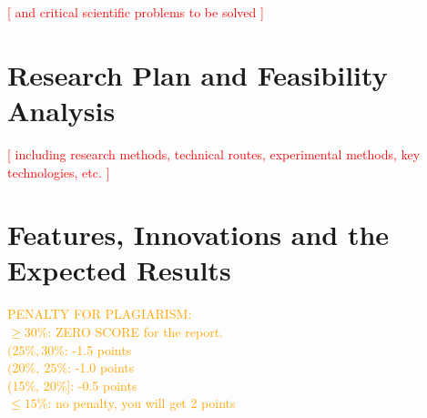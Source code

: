 \documentclass[a4paper]{article}
\newcommand{\todo}[1]{\textcolor{red}{[ #1 ]}}
\newcommand{\instruction}[1]{\textcolor{orange}{#1}}
\begin{document}
\todo{and critical scientific problems to be solved}

\section{Research Plan and Feasibility Analysis}

\todo{including research methods, technical routes, experimental methods,
    key technologies, etc.}

\section{Features, Innovations and the Expected Results}

\instruction{
    PENALTY FOR PLAGIARISM:\\
    \(\geq 30\%\): ZERO SCORE for the report.\\
    \((25\%,30\%\): -1.5 points\\
    \((20\%,\ 25\%\): -1.0 points\\
    (15\%, 20\%]: -0.5 points\\
    \(\leq 15\%\): no penalty, you will get 2 points
}

\printbibliography
\end{document}
